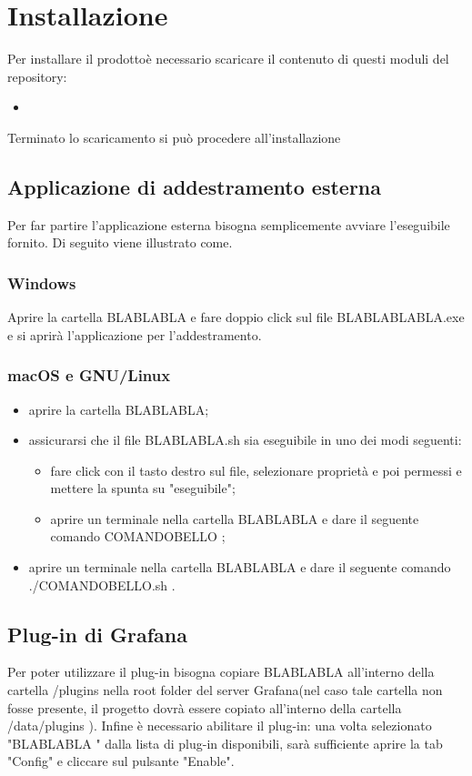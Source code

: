 \section{Installazione}
Per installare il prodotto\glosp è necessario scaricare il contenuto di questi moduli del repository:
\begin{itemize}
	\item 
\end{itemize}
Terminato lo scaricamento si può procedere all'installazione

\subsection{Applicazione di addestramento esterna}
Per far partire l'applicazione esterna bisogna semplicemente avviare l'eseguibile fornito. Di seguito viene illustrato come.
	\subsubsection{Windows}
	Aprire la cartella BLABLABLA e fare doppio click sul file BLABLABLABLA.exe e si aprirà l'applicazione per l'addestramento.

	\subsubsection{macOS e GNU/Linux}
	\begin{itemize}
		\item aprire la cartella BLABLABLA;
		\item assicurarsi che il file BLABLABLA.sh sia eseguibile in uno dei modi seguenti:
		\begin{itemize}
			\item fare click con il tasto destro sul file, selezionare proprietà e poi permessi e mettere la spunta su "eseguibile";
			\item aprire un terminale nella cartella BLABLABLA e dare il seguente comando COMANDOBELLO ;
		\end{itemize}
		\item aprire un terminale nella cartella BLABLABLA e dare il seguente comando ./COMANDOBELLO.sh .
	\end{itemize}

\subsection{Plug-in di Grafana}
Per poter utilizzare il plug-in bisogna copiare BLABLABLA all'interno della cartella /plugins nella root folder del server Grafana\glosp (nel caso tale cartella non fosse presente, il progetto dovrà essere copiato all'interno della cartella /data/plugins ). Infine è necessario abilitare il plug-in: una volta selezionato "BLABLABLA " dalla lista di plug-in disponibili, sarà sufficiente aprire la tab "Config" e cliccare sul pulsante "Enable".

